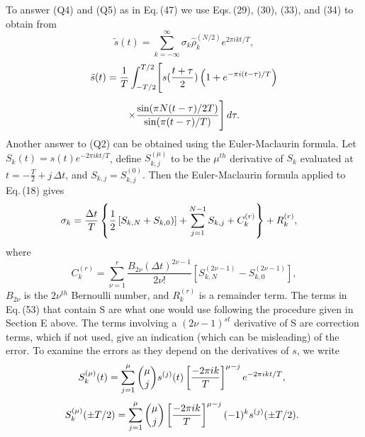 \documentclass[twoside]{MATH77}
\begin{document}
To answer (Q4) and (Q5) as in Eq.\,(47) we use Eqs.\,(29), (30), (33), and
(34) to obtain from
\begin{equation}\label{O51}
\tilde s(t)=\sum_{k=-\infty }^\infty \sigma _k\hat \rho
_k^{(N/2)}e^{2\pi ikt/T},
\end{equation}
\vspace{-10pt}
\begin{multline}\label{O52}
\tilde s(t)=\frac 1T\int_{-T/2}^{T/2}\Biggl [s(\frac{t+\tau }%
2)\left( 1+e^{-\pi i(t-\tau )/T}\right) \vspace{4pt} \\
\times \frac{\sin (\pi N(t-\tau )/2T)}{\sin (\pi (t-\tau )/T)}\Biggr ]%
\,d\tau .
\end{multline}
Another answer to (Q2) can be obtained using the Euler-Maclaurin
formula.  Let $S_k(t)=s(t)e^{-2\pi ikt/T}$, define $S_{k,j}^{(\mu )}$
to be the $\mu ^{th}$ derivative of $S_k$ evaluated at $t=-\frac
T2+j\,\Delta t$, and $S_{k,j}=S_{k,j}^{(0)}$. Then the
Euler-Maclaurin formula applied to Eq.\,(18) gives
\begin{equation}\label{O53}
\hspace{-10pt}
\sigma _k=\frac{\Delta t}T\left \{\frac 12\left[
S_{k,N}+S_{k,0})\right] +\sum_{j=1}^{N-1}S_{k,j} + C_k^{(r)} \right \} +
R_k^{(r)},
\end{equation}\vspace{-5pt}
where
\begin{equation*}
C_k^{(r)}=\sum_{\nu =1}^r\frac{B_{2\nu }(\Delta
t)^{2\nu -1}}{2\nu !}\left[ S_{k,N}^{(2\nu -1)}-
S_{k,0}^{(2\nu -1)}\right] ,
\end{equation*}
$B_{2\nu }$ is the $2\nu ^{th}$ Bernoulli number, and $R_k^{(r)}$ is
a remainder term. The terms in Eq.\,(53) that contain S are what one
would use following the procedure given in Section E above. The terms
involving a $(2\nu -1)^{st}$ derivative of S are correction terms,
which if not used, give an indication (which can be misleading) of
the error. To examine the errors as they depend on the derivatives of
$s$, we write
\begin{equation}\label{O54}
\hspace{-5pt}S_k^{(\mu )}(t)=\sum_{j=1}^\mu \binom
\mu js^{(j)}(t)\left[ \frac{-2\pi ik}T\right] ^{\mu -j}e^{-2\pi ikt/T},
\end{equation}
\vspace{-10pt}
\begin{equation}\label{O55}
\hspace{-5pt}S_k^{(\mu )}(\pm T/2)=\sum_{j=1}^\mu \binom
 \mu j\left[ \frac{-2\pi ik}T\right] ^{\mu -j}(-1)^ks^{(j)}(\pm T/2).
\end{equation}
\end{document}
